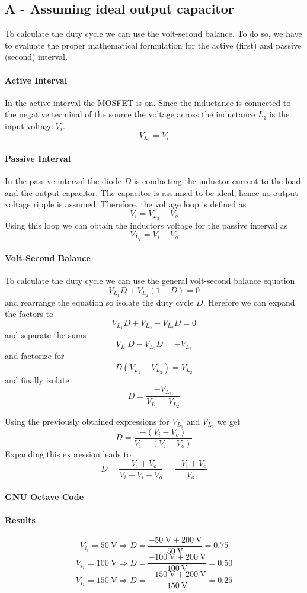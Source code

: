 \subsection{A - Assuming ideal output capacitor}
To calculate the duty cycle we can use the volt-second balance.
To do so, we have to evaluate the proper mathematical formulation
for the active (first) and passive (second) interval.

\paragraph{Active Interval}
In the active interval the MOSFET is on. Since the inductance is
connected to the negative terminal of the source the voltage across
the inductance $L_1$ is the input voltage $V_i$. 
\[ V_{L_{1}} = V_i \]

\paragraph{Passive Interval}
In the passive interval the diode $D$ is conducting the inductor
current to the load and the output capacitor. The capacitor is assumed
to be ideal, hence no output voltage ripple is assumed. Therefore, the
voltage loop is defined as
\[ V_i = V_{L_{2}} + V_o \]
Using this loop we can obtain the inductors voltage for the passive
interval as
\[ V_{L_{2}} = V_i - V_o \]

\paragraph{Volt-Second Balance}
To calculate the duty cycle we can use the general volt-second balance
equation
\[ V_{L_{1}} D + V_{L_{2}} (1-D) = 0 \]
and rearrange the equation so isolate the duty cycle $D$. Herefore
we can expand the factors to
\[ V_{L_{1}} D + V_{L_{2}} - V_{L_{2}} D = 0 \]
and separate the sums
\[ V_{L_{1}} D - V_{L_{2}} D = - V_{L_{2}} \]
and factorize for
\[ D (V_{L_{1}} - V_{L_{2}}) = V_{L_{2}} \]
and finally isolate 
\[ D = \frac{- V_{L_{2}}}{V_{L_{1}} - V_{L_{2}}} \]

Using the previously obtained expressions for $V_{L_{1}}$ and
$V_{L_{2}}$ we get
\[  D = \frac{-(V_i - V_o)}{V_i - (V_i - V_o)} \]
Expanding this expression leads to
\[ D = \frac{- V_i + V_o}{V_i - V_i + V_o} = \frac{- V_i + V_o}{V_o} \]

\paragraph{GNU Octave Code}




\paragraph{Results}
\[ V_{i_{1}} = \SI{50}{\volt}  \Rightarrow D = \frac{- \SI{50}{\volt}  + \SI{200}{\volt}}{\SI{50}{\volt}}  = 0.75 \]
\[ V_{i_{1}} = \SI{100}{\volt} \Rightarrow D = \frac{- \SI{100}{\volt} + \SI{200}{\volt}}{\SI{100}{\volt}} = 0.50 \]
\[ V_{i_{1}} = \SI{150}{\volt} \Rightarrow D = \frac{- \SI{150}{\volt} + \SI{200}{\volt}}{\SI{150}{\volt}} = 0.25 \]


